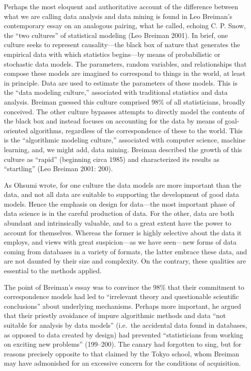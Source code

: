 \documentclass[
  letterpaper,
]{report}
\begin{document}
Perhaps the most eloquent and authoritative account of the difference
between what we are calling data analysis and data mining is found in
Leo Breiman's contemporary essay on an analogous pairing, what he
called, echoing C. P. Snow, the ``two cultures'' of statistical modeling
(Leo Breiman 2001). In brief, one culture seeks to represent
causality---the black box of nature that generates the empirical data
with which statistics begins---by means of probabilistic or stochastic
data models. The parameters, random variables, and relationships that
compose these models are imagined to correspond to things in the world,
at least in principle. Data are used to estimate the parameters of these
models. This is the ``data modeling culture,'' associated with
traditional statistics and data analysis. Breiman guessed this culture
comprised 98\% of all statisticians, broadly conceived. The other
culture bypasses attempts to directly model the contents of the black
box and instead focuses on accounting for the data by means of
goal-oriented algorithms, regardless of the correspondence of these to
the world. This is the ``algorithmic modeling culture,'' associated with
computer science, machine learning, and, we might add, data mining.
Breiman described the growth of this culture as ``rapid'' (beginning
circa 1985) and characterized its results as ``startling'' (Leo Breiman
2001: 200).

As Ohsumi wrote, for one culture the data models are more important than
the data, and not all data are suitable to supporting the development of
good data models. Hence the emphasis on design for data---the most
important phase of data science is in the careful production of data.
For the other, data are both abundant and intrinsically valuable, and to
a great extent have the power to account for themselves. Whereas the
former is highly selective about the data it employs, and views with
great suspicion---as we have seen---new forms of data coming from
databases in a variety of formats, the latter embrace these data, and
are not daunted by their size and complexity. On the contrary, these
qualities are essential to the methods applied.

The point of Breiman's essay was to convince the 98\% that their
commitment to correspondence models had led to ``irrelevant theory and
questionable scientific conclusions'' about underlying mechanisms.
Perhaps more important, he argued that their priestly avoidance of
impure algorithmic methods and data ``not suitable for analysis by data
models'' (i.e.~the accidental data found in databases, as opposed to
data created by design) had prevented ``statisticians from working on
exciting new problems'' (199--200). The canary had forgotten to sing,
but for reasons precisely opposite to that claimed by the Tokyo school,
whom Breiman may have admonished for an excessive concern for the
conditions of acquisition.
\end{document}

